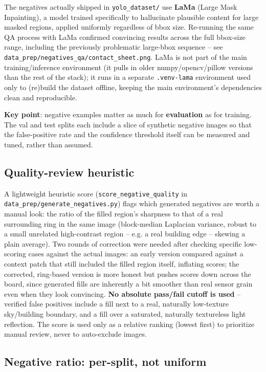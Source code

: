 \documentclass[11pt,a4paper]{article}
\begin{document}
The negatives actually shipped in \texttt{yolo\_dataset/} use \textbf{LaMa} (Large Mask
Inpainting), a model trained specifically to hallucinate plausible content for large masked
regions, applied uniformly regardless of bbox size. Re-running the same QA process with LaMa
confirmed convincing results across the full bbox-size range, including the previously
problematic large-bbox sequence -- see \texttt{data\_prep/negatives\_qa/contact\_sheet.png}. LaMa
is not part of the main training/inference environment (it pulls in older numpy/opencv/pillow
versions than the rest of the stack); it runs in a separate \texttt{.venv-lama} environment used
only to (re)build the dataset offline, keeping the main environment's dependencies clean and
reproducible.

\textbf{Key point}: negative examples matter as much for \textbf{evaluation} as for training. The
val and test splits each include a slice of synthetic negative images so that the false-positive
rate and the confidence threshold itself can be measured and tuned, rather than assumed.

\subsection{Quality-review heuristic}

A lightweight heuristic score (\texttt{score\_negative\_quality} in
\texttt{data\_prep/generate\_negatives.py}) flags which generated negatives are worth a manual
look: the ratio of the filled region's sharpness to that of a real surrounding ring in the same
image (block-median Laplacian variance, robust to a small unrelated high-contrast region --
e.g. a real building edge -- skewing a plain average). Two rounds of correction were needed
after checking specific low-scoring cases against the actual images: an early version compared
against a context patch that still included the filled region itself, inflating scores; the
corrected, ring-based version is more honest but pushes scores down across the board, since
generated fills are inherently a bit smoother than real sensor grain even when they look
convincing. \textbf{No absolute pass/fail cutoff is used} -- verified false positives include a
fill next to a real, naturally low-texture sky/building boundary, and a fill over a saturated,
naturally textureless light reflection. The score is used only as a relative ranking (lowest
first) to prioritize manual review, never to auto-exclude images.

\subsection{Negative ratio: per-split, not uniform}
\end{document}
